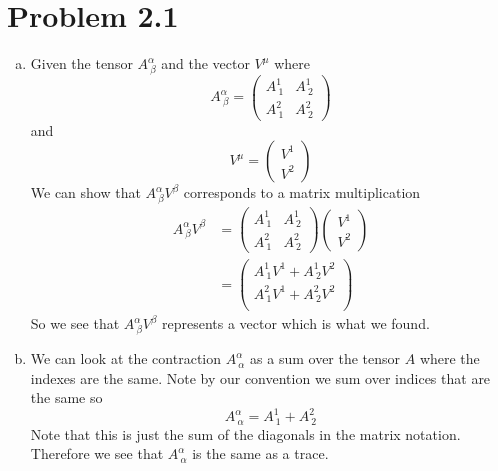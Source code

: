 \documentclass[11pt]{article}
\numberwithin{equation}{section}
\begin{document}


\section{Problem 2.1}
\begin{enumerate}[(a)]
\item
Given the tensor $A^{\alpha}_{\ \beta}$ and the vector $V^{\mu}$ where
$$A^{\alpha}_{\ \beta} = \left(\begin{array}{cc}
			A^1_{\ 1} &A^1_{\ 2}\\
			A^2_{\ 1} &A^2_{\ 2}
			\end{array}\right)$$
and 
$$V^{\mu} = \left(\begin{array}{c}
			V^1\\
			V^2
		\end{array}\right)$$
We can show that $A^{\alpha}_{\ \beta}V^{\beta}$ corresponds to a matrix multiplication
\begin{align*}
A^{\alpha}_{\ \beta}V^{\beta} &= \left(\begin{array}{cc}
			A^1_{\ 1} &A^1_{\ 2}\\
			A^2_{\ 1} &A^2_{\ 2}
			\end{array}\right)
			\left(\begin{array}{c}
			V^1\\
			V^2
			\end{array}\right)\\
&= 			\left(\begin{array}{c}
			A^1_{\ 1}V^1 + A^1_{\ 2}V^2\\
			A^2_{\ 1}V^1 + A^2_{\ 2}V^2\\
			\end{array}\right)
\end{align*}
So we see that $A^{\alpha}_{\ \beta}V^{\beta}$ represents a vector which is what we found.

\item
We can look at the contraction $A^{\alpha}_{\ \alpha}$ as a sum over the tensor $A$ where the indexes are the same. Note by our convention we sum over indices that are the same so 
$$A^{\alpha}_{\ \alpha} =  A^1_{\ 1} + A^2_{\ 2}$$
Note that this is just the sum of the diagonals in the matrix notation. Therefore we see that $A^{\alpha}_{\ \alpha}$ is the same as a trace.


\end{enumerate}
\end{document}

